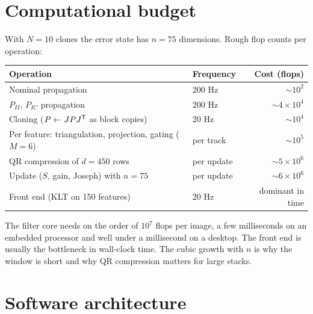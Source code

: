 \section{Computational budget}

With $N = 10$ clones the error state has $n = 75$ dimensions. Rough flop counts per operation:
\begin{center}\small
\begin{tabular}{@{}l l r@{}}
\toprule
Operation & Frequency & Cost (flops) \\
\midrule
Nominal propagation & 200 Hz & $\sim10^2$ \\
$P_{II}$, $P_{IC}$ propagation & 200 Hz & $\sim4\times10^4$ \\
Cloning ($P \gets JPJ^{\mathsf{T}}$ as block copies) & 20 Hz & $\sim10^4$ \\
Per feature: triangulation, projection, gating ($M = 6$) & per track & $\sim10^5$ \\
QR compression of $d = 450$ rows & per update & $\sim5\times10^6$ \\
Update ($S$, gain, Joseph) with $n = 75$ & per update & $\sim6\times10^6$ \\
Front end (KLT on 150 features) & 20 Hz & dominant in time \\
\bottomrule
\end{tabular}
\end{center}
The filter core needs on the order of $10^7$ flops per image, a few milliseconds on an embedded processor and well under a
millisecond on a desktop. The front end is usually the bottleneck in wall-clock time. The cubic growth with $n$ is why the window
is short and why QR compression matters for large stacks.

\section{Software architecture}

